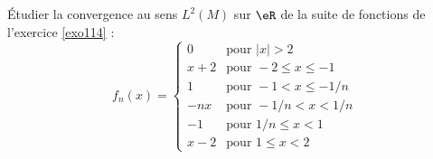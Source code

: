

\begin{exercice}\label{exo_I-4-1}

Étudier la convergence au sens $ L^2(M)$ sur $\eR$ de la suite de fonctions de l'exercice \ref{exo114} :
\begin{equation}
f_n(x)=
	\begin{cases}
	0	&	\text{pour }| x |>2\\
	x+2	&	\text{pour }-2\leq x\leq -1\\
	1	&	\text{pour }-1<x\leq -1/n\\
	-nx	&	\text{pour }-1/n<x<1/n\\
	-1	&	\text{pour }1/n\leq x<1\\
	x-2	&	 \text{pour }1\leq x<2
\end{cases}
\end{equation}

\end{exercice}

